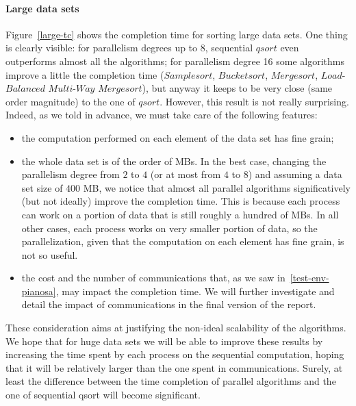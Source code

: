\paragraph{Large data sets}
Figure~\ref{large-tc} shows the completion time for sorting large data sets. One thing is clearly visible: for parallelism degrees up to 8, sequential $qsort$ even outperforms almost all the algorithms; for parallelism degree 16 some algorithms improve a little the completion time ($Samplesort$, $Bucketsort$, $Mergesort$, $Load$-$Balanced$ $Multi$-$Way$ $Mergesort$), but anyway it keeps to be very close (same order magnitude) to the one of $qsort$. However, this result is not really surprising. Indeed, as we told in advance, we must take care of the following features:
\begin{itemize}
\item the computation performed on each element of the data set has fine grain;
\item the whole data set is of the order of MBs. In the best case, changing the parallelism degree from $2$ to $4$ (or at most from $4$ to $8$) and assuming a data set size of $400$ MB, we notice that almost all parallel algorithms significatively (but not ideally) improve the completion time. This is because each process can work on a portion of data that is still roughly a hundred of MBs. In all other cases, each process works on very smaller portion of data, so the parallelization, given that the computation on each element has fine grain, is not so useful. 
\item the cost and the number of communications that, as we saw in~\ref{test-env-pianosa}, may impact the completion time. We will further investigate and detail the impact of communications in the final version of the report.
\end{itemize}
These consideration aims at justifying the non-ideal scalability of the algorithms. We hope that for huge data sets we will be able to improve these results by increasing the time spent by each process on the sequential computation, hoping that it will be relatively larger than the one spent in communications. Surely, at least the difference between the time completion of parallel algorithms and the one of sequential qsort will become significant.
